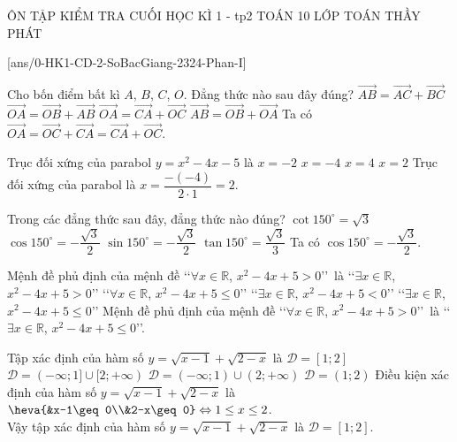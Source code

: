\setcounter{deso}{2}
\begin{name}
	{ÔN TẬP KIỂM TRA CUỐI HỌC KÌ 1 - tp2}
	{TOÁN 10}
	{LỚP TOÁN THẦY PHÁT}
	{\thoigian}
\end{name}
\caulc
{}[ans/0-HK1-CD-2-SoBacGiang-2324-Phan-I]
\begin{ex}%
	Cho bốn điểm bất kì $A$, $B$, $C$, $O$. Đẳng thức nào sau đây đúng?
	\choice
	{$\overrightarrow{AB}=\overrightarrow{AC}+\overrightarrow{BC}$}
	{$\overrightarrow{OA}=\overrightarrow{OB}+\overrightarrow{AB}$}
	{\True $\overrightarrow{OA}=\overrightarrow{CA}+\overrightarrow{OC}$}
	{$\overrightarrow{AB}=\overrightarrow{OB}+\overrightarrow{OA}$}
	\loigiai
	{
		Ta có $\overrightarrow{OA}=\overrightarrow{OC}+\overrightarrow{CA}=\overrightarrow{CA}+\overrightarrow{OC}$.
	}
\end{ex}

\begin{ex}%
	Trục đối xứng của parabol $y=x^2-4x-5$ là
	\choice
	{$x=-2$}
	{$x=-4$}
	{$x=4$}
	{\True $x=2$}
	\loigiai
	{
		Trục đối xứng của parabol là $x=\dfrac{-(-4)}{2\cdot1}=2$.
	}
\end{ex}

\begin{ex}%
	Trong các đẳng thức sau đây, đẳng thức nào đúng?
	\choice
	{$\cot 150^\circ=\sqrt 3$}
	{\True $\cos 150^\circ=-\dfrac{\sqrt 3}{2}$}
	{$\sin 150^\circ=-\dfrac{\sqrt 3}{2}$}
	{$\tan 150^\circ=\dfrac{\sqrt 3}{3}$}
	\loigiai
	{
		Ta có $\cos 150^\circ=-\dfrac{\sqrt 3}{2}$.
	}
\end{ex}

\begin{ex}%
	Mệnh đề phủ định của mệnh đề \lq\lq $\forall x\in\mathbb{R}$, $x^2-4x+5>0$\rq\rq\ là
	\choice
	{\lq\lq $\exists x\in\mathbb{R}$, $x^2-4x+5>0$\rq\rq}
	{\lq\lq $\forall x\in\mathbb{R}$, $x^2-4x+5\leq 0$\rq\rq}
	{\lq\lq $\exists x\in\mathbb{R}$, $x^2-4x+5<0$\rq\rq}
	{\True \lq\lq $\exists x\in\mathbb{R}$, $x^2-4x+5\leq 0$\rq\rq}
	\loigiai
	{
		Mệnh đề phủ định của mệnh đề \lq\lq $\forall x\in\mathbb{R}$, $x^2-4x+5>0$\rq\rq\ là \lq\lq $\exists x\in\mathbb{R}$, $x^2-4x+5\leq 0$\rq\rq.
	}
\end{ex}

\begin{ex}%
	Tập xác định của hàm số $y=\sqrt{x-1}+\sqrt{2-x}$ là
	\choice
	{\True $\mathscr{D}=[1;2]$}
	{$\mathscr{D}=(-\infty;1]\cup[2;+\infty)$}
	{$\mathscr{D}=(-\infty;1)\cup (2;+\infty)$}
	{$\mathscr{D}=(1;2)$}
	\loigiai
	{
		Điều kiện xác định của hàm số $y=\sqrt{x-1}+\sqrt{2-x}$ là $\heva{&x-1\geq 0\\&2-x\geq 0} \Leftrightarrow 1\leq x\leq 2$.\\
		Vậy tập xác định của hàm số $y=\sqrt{x-1}+\sqrt{2-x}$ là $\mathscr{D}=[1;2]$.
	}
\end{ex}

